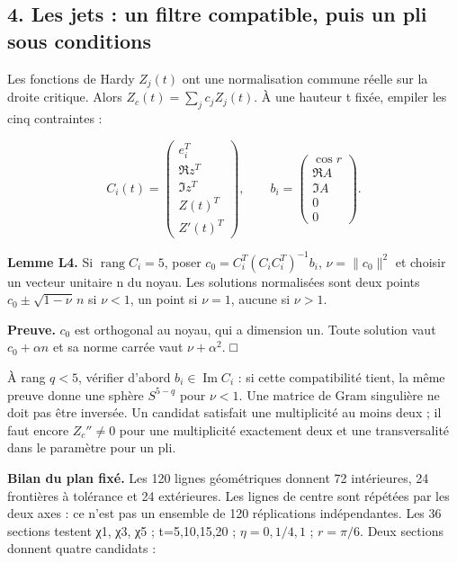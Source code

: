 \documentclass[
  10pt,
  a4paper,
]{article}
\begin{document}
\newpage

\hypertarget{les-jets-un-filtre-compatible-puis-un-pli-sous-conditions}{%
\subsection{4. Les jets : un filtre compatible, puis un pli sous
conditions}\label{les-jets-un-filtre-compatible-puis-un-pli-sous-conditions}}

Les fonctions de Hardy \(Z_j(t)\) ont une normalisation commune réelle
sur la droite critique. Alors \(Z_c(t)=\sum_jc_jZ_j(t)\). À une hauteur
t fixée, empiler les cinq contraintes :

\[
C_i(t)=\begin{pmatrix}e_i^T\\\Re z^T\\\Im z^T\\Z(t)^T\\Z'(t)^T\end{pmatrix},
\qquad b_i=\begin{pmatrix}\cos r\\\Re A\\\Im A\\0\\0\end{pmatrix}.
\]

\textbf{Lemme L4.} Si \(\operatorname{rang}C_i=5\), poser
\(c_0=C_i^T(C_iC_i^T)^{-1}b_i\), \(\nu=\|c_0\|^2\) et choisir un vecteur
unitaire n du noyau. Les solutions normalisées sont deux points
\(c_0\pm\sqrt{1-\nu}\,n\) si \(\nu<1\), un point si \(\nu=1\), aucune si
\(\nu>1\).

\textbf{Preuve.} \(c_0\) est orthogonal au noyau, qui a dimension un.
Toute solution vaut \(c_0+\alpha n\) et sa norme carrée vaut
\(\nu+\alpha^2\). □

À rang \(q<5\), vérifier d'abord \(b_i\in\operatorname{Im}C_i\) : si
cette compatibilité tient, la même preuve donne une sphère \(S^{5-q}\)
pour \(\nu<1\). Une matrice de Gram singulière ne doit pas être
inversée. Un candidat satisfait une multiplicité au moins deux ; il faut
encore \(Z_c''\ne0\) pour une multiplicité exactement deux et une
transversalité dans le paramètre pour un pli.

\textbf{Bilan du plan fixé.} Les 120 lignes géométriques donnent 72
intérieures, 24 frontières à tolérance et 24 extérieures. Les lignes de
centre sont répétées par les deux axes : ce n'est pas un ensemble de 120
réplications indépendantes. Les 36 sections testent χ1, χ3, χ5 ;
t=5,10,15,20 ; \(\eta=0,1/4,1\) ; \(r=\pi/6\). Deux sections donnent
quatre candidats :
\end{document}
